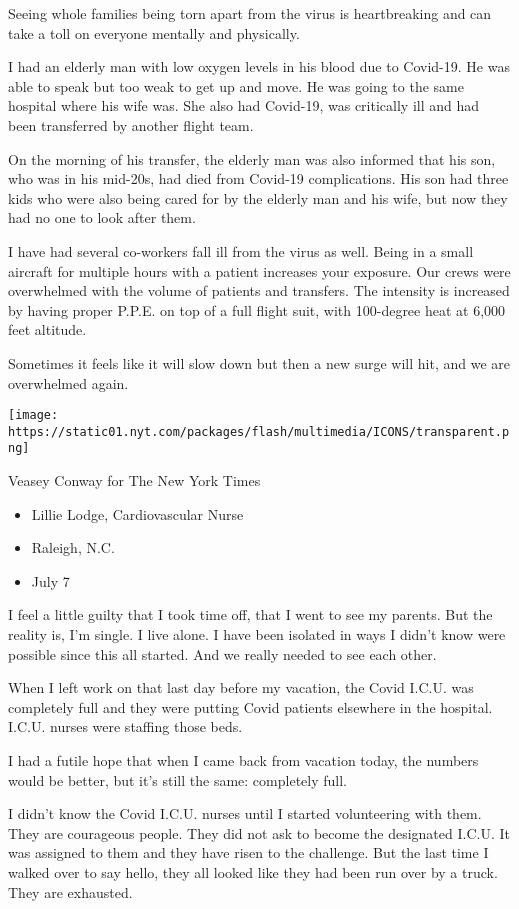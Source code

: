 Seeing whole families being torn apart from the virus is heartbreaking
and can take a toll on everyone mentally and physically.

I had an elderly man with low oxygen levels in his blood due to
Covid-19. He was able to speak but too weak to get up and move. He was
going to the same hospital where his wife was. She also had Covid-19,
was critically ill and had been transferred by another flight team.

On the morning of his transfer, the elderly man was also informed that
his son, who was in his mid-20s, had died from Covid-19 complications.
His son had three kids who were also being cared for by the elderly man
and his wife, but now they had no one to look after them.

I have had several co-workers fall ill from the virus as well. Being in
a small aircraft for multiple hours with a patient increases your
exposure. Our crews were overwhelmed with the volume of patients and
transfers. The intensity is increased by having proper P.P.E. on top of
a full flight suit, with 100-degree heat at 6,000 feet altitude.

Sometimes it feels like it will slow down but then a new surge will hit,
and we are overwhelmed again.

\texttt{[image: https://static01.nyt.com/packages/flash/multimedia/ICONS/transparent.png]}

Veasey Conway for The New York Times

\begin{itemize}
\tightlist
\item
  Lillie Lodge, Cardiovascular Nurse
\item
  Raleigh, N.C.
\item
  July 7
\end{itemize}

I feel a little guilty that I took time off, that I went to see my
parents. But the reality is, I'm single. I live alone. I have been
isolated in ways I didn't know were possible since this all started. And
we really needed to see each other.

When I left work on that last day before my vacation, the Covid I.C.U.
was completely full and they were putting Covid patients elsewhere in
the hospital. I.C.U. nurses were staffing those beds.

I had a futile hope that when I came back from vacation today, the
numbers would be better, but it's still the same: completely full.

I didn't know the Covid I.C.U. nurses until I started volunteering with
them. They are courageous people. They did not ask to become the
designated I.C.U. It was assigned to them and they have risen to the
challenge. But the last time I walked over to say hello, they all looked
like they had been run over by a truck. They are exhausted.

